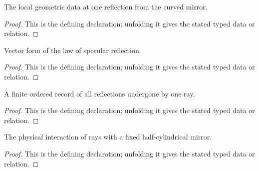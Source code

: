 \begin{definition}[ReflectionEvent]
  \label{decl:physics:IPhO_2026_2_A_1:ReflectionEvent}
  The local geometric data at one reflection from the curved mirror.
\end{definition}
\begin{proof}
  This is the defining declaration; unfolding it gives the stated typed data or relation.
\end{proof}

\begin{definition}[IsSpecularReflection]
  \label{decl:physics:IPhO_2026_2_A_1:IsSpecularReflection}
  Vector form of the law of specular reflection.
\end{definition}
\begin{proof}
  This is the defining declaration; unfolding it gives the stated typed data or relation.
\end{proof}

\begin{definition}[ReflectionTrace]
  \label{decl:physics:IPhO_2026_2_A_1:ReflectionTrace}
  A finite ordered record of all reflections undergone by one ray.
\end{definition}
\begin{proof}
  This is the defining declaration; unfolding it gives the stated typed data or relation.
\end{proof}

\begin{definition}[MirrorDynamics]
  \label{decl:physics:IPhO_2026_2_A_1:MirrorDynamics}
  The physical interaction of rays with a fixed half-cylindrical mirror.
\end{definition}
\begin{proof}
  This is the defining declaration; unfolding it gives the stated typed data or relation.
\end{proof}

